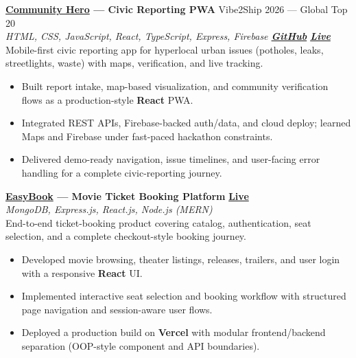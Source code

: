 \documentclass[a4paper,10pt]{article}
\begin{document}
\vspace{1.35mm}
\noindent\textbf{\href{https://community-hero-eight.vercel.app}{Community Hero} --- Civic Reporting PWA}
\hfill {\small Vibe2Ship 2026 --- Global Top 20}\\
\textit{\small HTML, CSS, JavaScript, React, TypeScript, Express, Firebase \textbar{}
\href{https://github.com/Ojas-Srivastava05/community-hero}{\textbf{GitHub}} \textbar{}
\href{https://community-hero-eight.vercel.app}{\textbf{Live}}}\\[0.45mm]
Mobile-first civic reporting app for hyperlocal urban issues (potholes, leaks, streetlights, waste) with maps, verification, and live tracking.
\begin{itemize}
  \item Built report intake, map-based visualization, and community verification flows as a production-style \textbf{React} PWA.
  \item Integrated REST APIs, Firebase-backed auth/data, and cloud deploy; learned Maps and Firebase under fast-paced hackathon constraints.
  \item Delivered demo-ready navigation, issue timelines, and user-facing error handling for a complete civic-reporting journey.
\end{itemize}

\vspace{1.35mm}
\noindent\textbf{\href{https://easy-book-kappa.vercel.app/}{EasyBook} --- Movie Ticket Booking Platform}
\hfill \href{https://easy-book-kappa.vercel.app/}{\textbf{\small Live}}\\
\textit{\small MongoDB, Express.js, React.js, Node.js (MERN)}\\[0.45mm]
End-to-end ticket-booking product covering catalog, authentication, seat selection, and a complete checkout-style booking journey.
\begin{itemize}
  \item Developed movie browsing, theater listings, releases, trailers, and user login with a responsive \textbf{React} UI.
  \item Implemented interactive seat selection and booking workflow with structured page navigation and session-aware user flows.
  \item Deployed a production build on \textbf{Vercel} with modular frontend/backend separation (OOP-style component and API boundaries).
\end{itemize}
\end{document}
